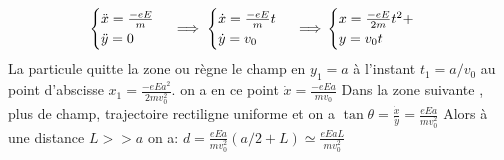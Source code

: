 \begin{Answer}
		\Question
		\[\begin{cases}
		\ddot{x} =\frac{-eE}{m}\\
		\ddot{y} =0\\
		\end{cases} \implies
		\begin{cases}
		\dot{x} = \frac{-eE}{m}t\\
		\dot{y} = v_0
		\end{cases} \implies\\
		\begin{cases}
		x = \frac{-eE}{2m}t^2 + \\
		y = v_0  t
		\end{cases}
		\]
		La particule quitte la zone ou règne le champ en $y_1=a$ à l'instant $t_1 = a/v_0 $  au point d'abscisse $x_1 = \frac{-eEa^2}{2mv_0^2}$. on a en ce point $\dot{x} = \frac{-eEa}{mv_0}$
		\Question Dans la zone suivante , plus de champ, trajectoire rectiligne uniforme et on a $\tan\theta = \frac{\dot{x}}{\dot{y}} = \frac{eEa}{mv_0^2}$
		\Question Alors à une distance $L >> a$ on a:
		$d = \frac{eEa}{mv_0^2}(a/2+L) \simeq \frac{eEaL}{mv_0^2}$
\end{Answer}
